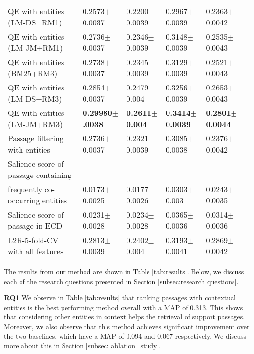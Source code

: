 \documentclass[sigconf]{acmart}
\begin{document}
\begin{table}
{\begin{tabular}{lp{2cm}p{2cm}p{2cm}p{2cm}l}
QE with entities (LM-DS+RM1)&	0.2573$\pm$0.0037&	0.2200$\pm$0.0039&	0.2967$\pm$0.0039&	
0.2363$\pm$0.0042 \\

QE with entities (LM-JM+RM1)&	0.2736$\pm$0.0037&	0.2346$\pm$0.0039&	0.3148$\pm$0.0039&	
0.2535$\pm$0.0043 \\

QE with entities (BM25+RM3)&	0.2738$\pm$0.0037&	0.2345$\pm$0.0039&	0.3129$\pm$0.0039&	
0.2521$\pm$0.0043 \\

QE with entities  (LM-DS+RM3)&	0.2854$\pm$0.0037&	0.2479$\pm$0.004&	0.3256$\pm$0.0039&	
0.2653$\pm$0.0043 \\

QE with entities  (LM-JM+RM3)&	\textbf{0.29980$\pm$.0038}&	\textbf{0.2611$\pm$0.004}&	\textbf{0.3414$\pm$0.0039}&	
\textbf{0.2801$\pm$0.0044} \\
\midrule

Passage filtering with entities &	0.2736$\pm
$0.0037&	0.2321$\pm$0.0039&	0.3085$\pm$0.0038&	
0.2376$\pm$0.0042 \\

Salience score of passage containing \\ frequently co-occurring entities&	0.0173$\pm$0.0025&	0.0177$\pm$0.0026&	0.0303$\pm$0.003&	
0.0243$\pm$0.0035 \\

Salience score of passage in ECD&	0.0231$\pm$0.0028&	0.0234$\pm$0.0028&	0.0365$\pm$0.0036&	
0.0314$\pm$0.0036 \\
\midrule
L2R-5-fold-CV with all features & 0.2813$\pm$0.0039&	0.2402$\pm$0.004&	0.3193$\pm$0.0041&	
0.2869$\pm$0.0042 \\


			
  \bottomrule
\end{tabular}}
\end{table}

The results from our method are shown in Table \ref{tab:results}. Below, we discuss each of the research questions presented in Section \ref{subsec:research questions}.

\textbf{RQ1} We observe in Table \ref{tab:results} that ranking passages with contextual entities is the best performing method overall with a MAP of 0.313. This shows that considering other entities in context helps the retrieval of support passages. Moreover, we also observe that this method achieves significant improvement over the two baselines, which have a MAP of 0.094 and 0.067 respectively. We discuss more about this in Section \ref{subsec: ablation_study}.
\end{document}
